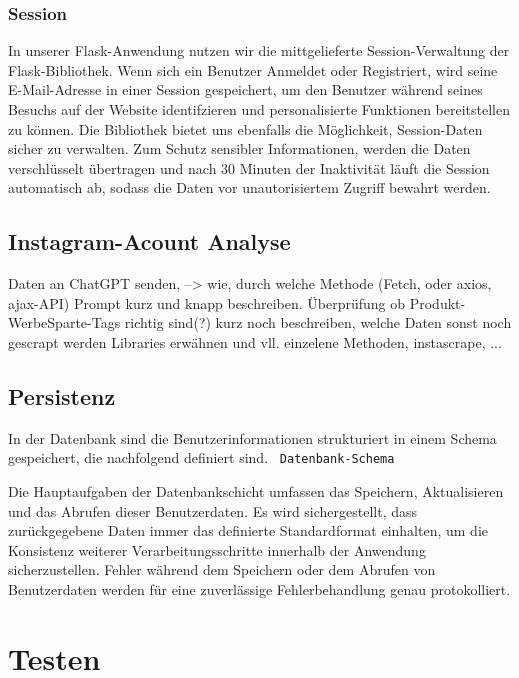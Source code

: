 \documentclass[conference,a4paper,flushend]{cs-techrep}
\begin{document}
\subsubsection{Session}
In unserer Flask-Anwendung nutzen wir die mittgelieferte Session-Verwaltung der Flask-Bibliothek. Wenn sich ein Benutzer Anmeldet oder Registriert, wird seine E-Mail-Adresse in einer Session gespeichert, um den Benutzer während seines Besuchs auf der Website identifzieren und personalisierte Funktionen bereitstellen zu können. Die Bibliothek bietet uns ebenfalls die Möglichkeit, Session-Daten sicher zu verwalten. Zum Schutz sensibler Informationen, werden die Daten verschlüsselt übertragen und nach 30 Minuten der Inaktivität läuft die Session automatisch ab, sodass die Daten vor unautorisiertem Zugriff bewahrt werden.


\subsection{Instagram-Acount Analyse}
Daten an ChatGPT senden, --> wie, durch welche Methode (Fetch, oder axios, ajax-API) 
Prompt kurz und knapp beschreiben. 
Überprüfung ob Produkt-WerbeSparte-Tags richtig sind(?)
kurz noch beschreiben, welche Daten sonst noch gescrapt werden
Libraries erwähnen und vll. einzelene Methoden, instascrape, ...

\subsection{Persistenz}

In der Datenbank sind die Benutzerinformationen strukturiert in einem Schema gespeichert, die nachfolgend definiert sind. 
\texttt{
Datenbank-Schema
}

Die Hauptaufgaben der Datenbankschicht umfassen das Speichern, Aktualisieren und das Abrufen dieser Benutzerdaten. Es wird sichergestellt, dass zurückgegebene Daten immer das definierte Standardformat einhalten, um die Konsistenz weiterer Verarbeitungsschritte innerhalb der Anwendung sicherzustellen. Fehler während dem Speichern oder dem Abrufen von Benutzerdaten werden für eine zuverlässige Fehlerbehandlung genau protokolliert.






\section{Testen}
\end{document}
